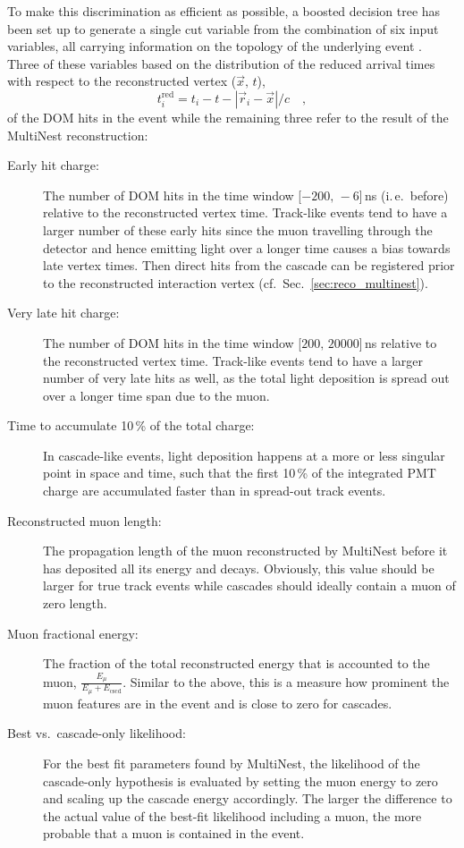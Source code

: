 To make this discrimination as efficient as possible, a boosted decision tree
\cite{BDT} has been set up to generate a single cut variable from the
combination of six input variables, all carrying information on the topology of
the underlying event \cite{PID_BDT}. Three of these variables based on the
distribution of the reduced arrival times with respect to the reconstructed
vertex ($\vec{x},\,t$),
\begin{equation}
 t_i^\mathrm{red} = t_i - t - |\vec{r}_i - \vec{x}|/c \quad,
\end{equation}
of the DOM hits in the event while the remaining three refer to the result of
the MultiNest reconstruction:
\begin{description}
 \item[Early hit charge:] The number of DOM hits in the time window
  [$-200,\,-6$]\,ns (i.\,e.\ before) relative to the reconstructed vertex time.
  Track-like events tend to have a larger number of these early hits since the
  muon travelling through the detector and hence emitting light over a longer
  time causes a bias towards late vertex times. Then direct hits from the
  cascade can be registered prior to the reconstructed interaction vertex
  (cf.~Sec.~\ref{sec:reco_multinest}).
 \item[Very late hit charge:] The number of DOM hits in the time window
  [$200,\,20000$]\,ns relative to the reconstructed vertex time. Track-like
  events tend to have a larger number of very late hits as well, as the total
  light deposition is spread out over a longer time span due to the muon.
 \item[Time to accumulate 10\,\% of the total charge:] In cascade-like events,
  light deposition happens at a more or less singular point in space and time,
  such that the first 10\,\% of the integrated PMT charge are accumulated 
  faster than in spread-out track events.
 \item[Reconstructed muon length:] The propagation length of the
  muon reconstructed by MultiNest before it has deposited all its energy and
  decays. Obviously, this value should be larger for true track events while
  cascades should ideally contain a muon of zero length.
 \item[Muon fractional energy:] The fraction of the total reconstructed energy
  that is accounted to the muon, $\frac{E_\mu}{E_\mu+E_\mathrm{cscd}}$. Similar
  to the above, this is a measure how prominent the muon features are in the
  event and is close to zero for cascades.
 \item[Best vs.\ cascade-only likelihood:] For the best fit parameters found by
  MultiNest, the likelihood of the cascade-only hypothesis is evaluated by
  setting the muon energy to zero and scaling up the cascade energy accordingly.
  The larger the difference to the actual value of the best-fit likelihood
  including a muon, the more probable that a muon is contained in the event.
\end{description}


